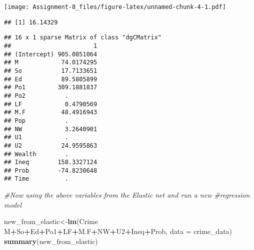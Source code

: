 \documentclass[
]{article}
\newenvironment{Shaded}{\begin{snugshade}}{\end{snugshade}}
\newcommand{\CommentTok}[1]{\textcolor[rgb]{0.56,0.35,0.01}{\textit{#1}}}
\newcommand{\DataTypeTok}[1]{\textcolor[rgb]{0.13,0.29,0.53}{#1}}
\newcommand{\KeywordTok}[1]{\textcolor[rgb]{0.13,0.29,0.53}{\textbf{#1}}}
\newcommand{\NormalTok}[1]{#1}
\newcommand{\OperatorTok}[1]{\textcolor[rgb]{0.81,0.36,0.00}{\textbf{#1}}}
\newcommand{\StringTok}[1]{\textcolor[rgb]{0.31,0.60,0.02}{#1}}
\begin{document}
\texttt{[image: Assignment-8\_files/figure-latex/unnamed-chunk-4-1.pdf]}

\begin{Shaded}
\end{Shaded}

\begin{verbatim}
## [1] 16.14329
\end{verbatim}

\begin{Shaded}
\end{Shaded}

\begin{verbatim}
## 16 x 1 sparse Matrix of class "dgCMatrix"
##                       1
## (Intercept) 905.0851064
## M            74.0174295
## So           17.7133651
## Ed           89.5805899
## Po1         309.1881837
## Po2           .        
## LF            0.4790569
## M.F          48.4916943
## Pop           .        
## NW            3.2640901
## U1            .        
## U2           24.9595863
## Wealth        .        
## Ineq        158.3327124
## Prob        -74.8230648
## Time          .
\end{verbatim}

\begin{Shaded}
\begin{Highlighting}[]
\CommentTok{#Now using the above variables from the Elastic net and run a new }
\CommentTok{#regression model}

\NormalTok{new_from_elastic<-}\KeywordTok{lm}\NormalTok{(Crime }\OperatorTok{~}\StringTok{ }\NormalTok{M}\OperatorTok{+}\NormalTok{So}\OperatorTok{+}\NormalTok{Ed}\OperatorTok{+}\NormalTok{Po1}\OperatorTok{+}\NormalTok{LF}\OperatorTok{+}\NormalTok{M.F}\OperatorTok{+}\NormalTok{NW}\OperatorTok{+}\NormalTok{U2}\OperatorTok{+}\NormalTok{Ineq}\OperatorTok{+}\NormalTok{Prob, }
                   \DataTypeTok{data =}\NormalTok{ crime_data)}
\KeywordTok{summary}\NormalTok{(new_from_elastic)}
\end{Highlighting}
\end{Shaded}
\end{document}
